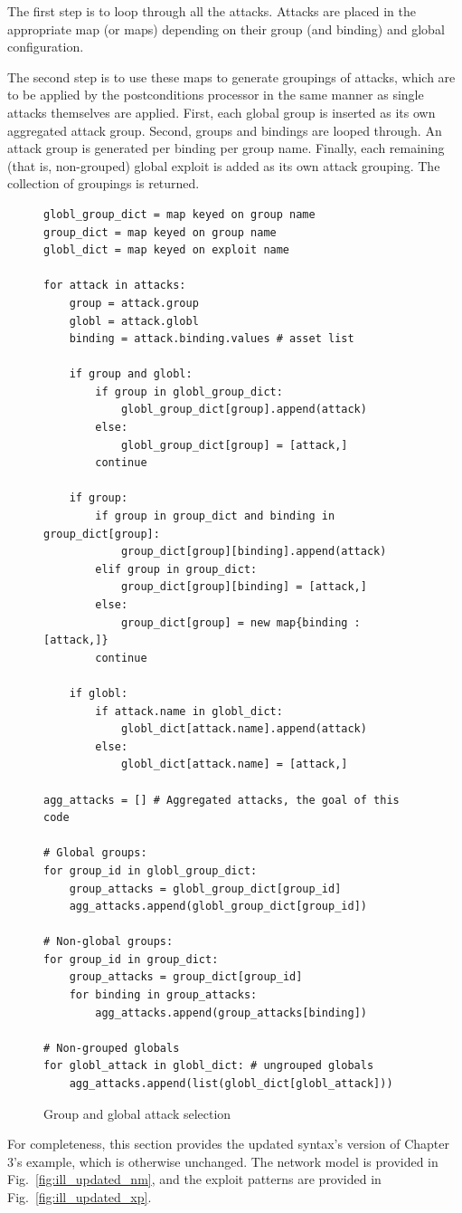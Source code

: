 The first step is to loop through all the attacks. Attacks are placed in the
appropriate map (or maps) depending on their group (and binding) and global
configuration.

The second step is to use these maps to generate groupings of attacks, which
are to be applied by the postconditions processor in the same manner as single
attacks themselves are applied. First, each global group is inserted as its
own aggregated attack group. Second, groups and bindings are looped through. An
attack group is generated per binding per group name. Finally,
each remaining (that is, non-grouped) global exploit is
added as its own attack grouping. The collection of groupings is returned.
\begin{figure}
\begin{lstlisting}
globl_group_dict = map keyed on group name
group_dict = map keyed on group name
globl_dict = map keyed on exploit name

for attack in attacks:
    group = attack.group
    globl = attack.globl
    binding = attack.binding.values # asset list
    
    if group and globl:
        if group in globl_group_dict:
            globl_group_dict[group].append(attack)
        else:
            globl_group_dict[group] = [attack,]
        continue

    if group:
        if group in group_dict and binding in group_dict[group]:
            group_dict[group][binding].append(attack)
        elif group in group_dict:
            group_dict[group][binding] = [attack,]
        else:
            group_dict[group] = new map{binding : [attack,]}
        continue
        
    if globl:
        if attack.name in globl_dict:
            globl_dict[attack.name].append(attack)
        else:
            globl_dict[attack.name] = [attack,]

agg_attacks = [] # Aggregated attacks, the goal of this code

# Global groups:
for group_id in globl_group_dict:
    group_attacks = globl_group_dict[group_id]
    agg_attacks.append(globl_group_dict[group_id])

# Non-global groups:
for group_id in group_dict:
    group_attacks = group_dict[group_id]
    for binding in group_attacks:
        agg_attacks.append(group_attacks[binding])

# Non-grouped globals
for globl_attack in globl_dict: # ungrouped globals
    agg_attacks.append(list(globl_dict[globl_attack]))
\end{lstlisting}
\caption{Group and global attack selection}
\label{fig:cpe_glgr_precondition_pc}
\end{figure}
For completeness, this section provides the updated syntax's version of
Chapter 3's example, which is otherwise unchanged. The network model is
provided in Fig.~\ref{fig:ill_updated_nm}, and the exploit patterns are
provided in Fig.~\ref{fig:ill_updated_xp}.

